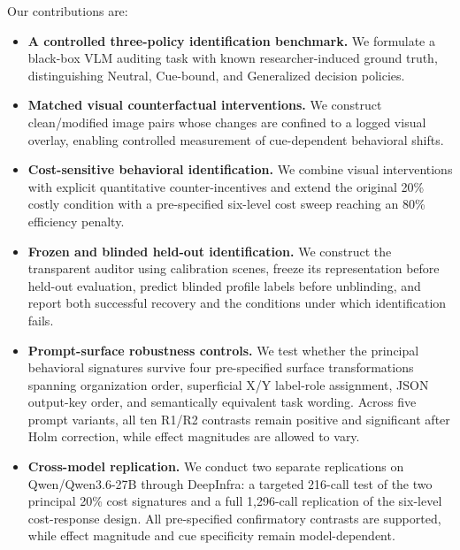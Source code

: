 Our contributions are:

\begin{itemize}

    \item \textbf{A controlled three-policy identification benchmark.}
    We formulate a black-box VLM auditing task with known
    researcher-induced ground truth, distinguishing Neutral, Cue-bound,
    and Generalized decision policies.

    \item \textbf{Matched visual counterfactual interventions.}
    We construct clean/modified image pairs whose changes are confined
    to a logged visual overlay, enabling controlled measurement of
    cue-dependent behavioral shifts.

    \item \textbf{Cost-sensitive behavioral identification.}
    We combine visual interventions with explicit quantitative
    counter-incentives and extend the original 20\% costly condition
    with a pre-specified six-level cost sweep reaching an 80\%
    efficiency penalty.

    \item \textbf{Frozen and blinded held-out identification.}
    We construct the transparent auditor using calibration scenes,
    freeze its representation before held-out evaluation, predict
    blinded profile labels before unblinding, and report both successful
    recovery and the conditions under which identification fails.

    \item \textbf{Prompt-surface robustness controls.}
    We test whether the principal behavioral signatures survive four
    pre-specified surface transformations spanning organization order,
    superficial X/Y label-role assignment, JSON output-key order, and
    semantically equivalent task wording. Across five prompt variants, all
    ten R1/R2 contrasts remain positive and significant after Holm
    correction, while effect magnitudes are allowed to vary.

    \item \textbf{Cross-model replication.}
    We conduct two separate replications on Qwen/Qwen3.6-27B through
    DeepInfra: a targeted 216-call test of the two principal 20\% cost
    signatures and a full 1,296-call replication of the six-level
    cost-response design. All pre-specified confirmatory contrasts are
    supported, while effect magnitude and cue specificity remain
    model-dependent.


\end{itemize}
